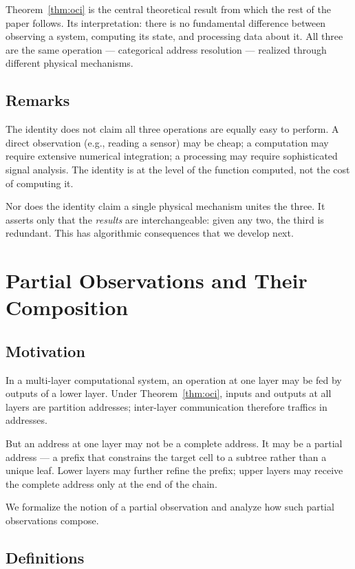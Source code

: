 \documentclass[11pt,twocolumn,a4paper]{article}
\theoremstyle{definition}
\theoremstyle{remark}
\begin{document}
Theorem~\ref{thm:oci} is the central theoretical result from which the rest of the paper follows. Its interpretation: there is no fundamental difference between observing a system, computing its state, and processing data about it. All three are the same operation --- categorical address resolution --- realized through different physical mechanisms.

\subsection{Remarks}

The identity does not claim all three operations are equally easy to perform. A direct observation (e.g., reading a sensor) may be cheap; a computation may require extensive numerical integration; a processing may require sophisticated signal analysis. The identity is at the level of the function computed, not the cost of computing it.

Nor does the identity claim a single physical mechanism unites the three. It asserts only that the \emph{results} are interchangeable: given any two, the third is redundant. This has algorithmic consequences that we develop next.

\section{Partial Observations and Their Composition}
\label{sec:partial}

\subsection{Motivation}

In a multi-layer computational system, an operation at one layer may be fed by outputs of a lower layer. Under Theorem~\ref{thm:oci}, inputs and outputs at all layers are partition addresses; inter-layer communication therefore traffics in addresses.

But an address at one layer may not be a complete address. It may be a partial address --- a prefix that constrains the target cell to a subtree rather than a unique leaf. Lower layers may further refine the prefix; upper layers may receive the complete address only at the end of the chain.

We formalize the notion of a partial observation and analyze how such partial observations compose.

\subsection{Definitions}
\end{document}
